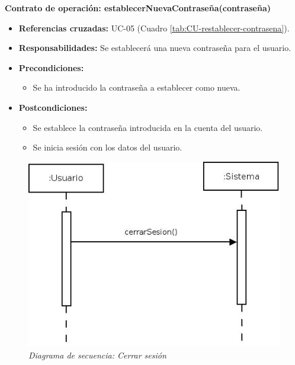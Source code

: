 \textbf{Contrato de operación: establecerNuevaContraseña(contraseña)}
\begin{itemize}
\item \textbf{Referencias cruzadas:} UC-05 (Cuadro \ref{tab:CU-restablecer-contrasena}).
\item \textbf{Responsabilidades:} Se establecerá una nueva contraseña para el usuario.
\item \textbf{Precondiciones:} 
 \begin{itemize}
\item Se ha introducido la contraseña a establecer como nueva.
\end {itemize}
\item \textbf{Postcondiciones:} 
 \begin{itemize}
\item Se establece la contraseña introducida en la cuenta del usuario.
\item Se inicia sesión con los datos del usuario. 
\end {itemize}
\end {itemize}


\vspace{10mm}

\begin{figure}
\centering
  \includegraphics[scale=.55]{img/secuencias/gestion-usuarios-cerrar-sesion.jpeg}
  \caption{\textit{Diagrama de secuencia: Cerrar sesión}}
  \label{fig:secuencia-gestion-usuarios-cerrar-sesion}
\end{figure}

